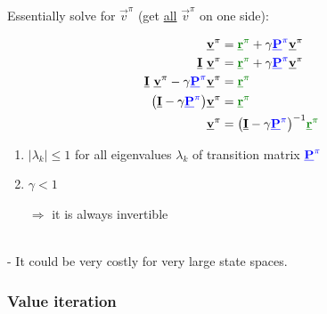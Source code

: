 \begin{frame}\frametitle{\subsubsecname}

Essentially solve for $\vec v^\pi$ (get \underline{all} $\vec v^\pi$ on one side):

	\begin{align}
		\vec v^\pi &= {\color{reward}\vec r^\pi} 
		+ \gamma {\color{trans}\vec P^\pi} \vec v^\pi \\
		\vec I~\vec v^\pi 
        &= {\color{reward}\vec r^\pi}
		+ \gamma {\color{trans}\vec P^\pi} \vec v^\pi
	\\
		\vec I~\vec v^\pi - \gamma {\color{trans}\vec P^\pi} \vec v^\pi
		&= {\color{reward}\vec r^\pi}
	\\
		\big(\vec I - \gamma {\color{trans}\vec P^\pi}\big) \vec v^\pi
		&= {\color{reward}\vec r^\pi}
	\\
	\vec v^\pi &= \big(\vec I 
			- \gamma {\color{trans}\vec P^\pi}\big)^{-1}
		 {\color{reward}\vec r^\pi}
	\end{align}
	
		
\begin{enumerate}
\item $|\lambda_k| \leq 1$ for all eigenvalues 
				$\lambda_k$ of transition matrix ${\color{trans}\vec P^\pi}$
\item $\gamma < 1$
\item[$\Rightarrow$] it is always invertible
\end{enumerate}

\slidesonly{\vspace{-5mm}}

\\

\pause 
- It could be very costly for very large state spaces.

\end{frame}


\subsubsection{Value iteration}

